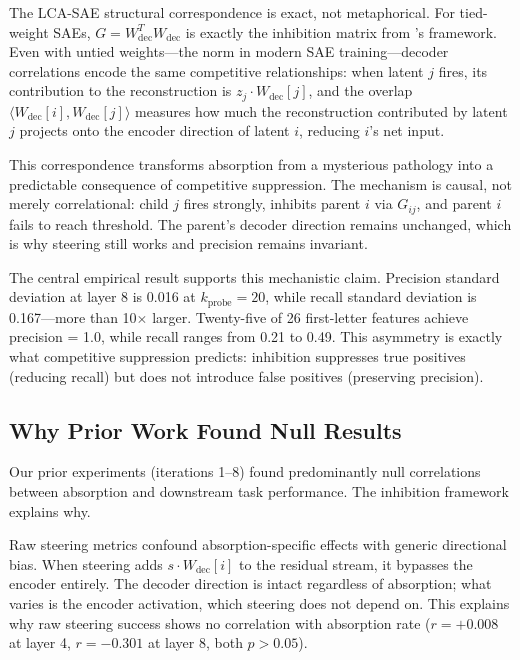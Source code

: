 \documentclass{article}
\begin{document}
The LCA-SAE structural correspondence is exact, not metaphorical. For tied-weight SAEs, $G = W_{\text{dec}}^T W_{\text{dec}}$ is exactly the inhibition matrix from \citet{rozell2008sparse}'s framework. Even with untied weights---the norm in modern SAE training---decoder correlations encode the same competitive relationships: when latent $j$ fires, its contribution to the reconstruction is $z_j \cdot W_{\text{dec}}[j]$, and the overlap $\langle W_{\text{dec}}[i], W_{\text{dec}}[j] \rangle$ measures how much the reconstruction contributed by latent $j$ projects onto the encoder direction of latent $i$, reducing $i$'s net input.

This correspondence transforms absorption from a mysterious pathology into a predictable consequence of competitive suppression. The mechanism is causal, not merely correlational: child $j$ fires strongly, inhibits parent $i$ via $G_{ij}$, and parent $i$ fails to reach threshold. The parent's decoder direction remains unchanged, which is why steering still works and precision remains invariant.

The central empirical result supports this mechanistic claim. Precision standard deviation at layer 8 is 0.016 at $k_{\text{probe}} = 20$, while recall standard deviation is 0.167---more than 10$\times$ larger. Twenty-five of 26 first-letter features achieve precision = 1.0, while recall ranges from 0.21 to 0.49. This asymmetry is exactly what competitive suppression predicts: inhibition suppresses true positives (reducing recall) but does not introduce false positives (preserving precision).

\subsection{Why Prior Work Found Null Results}

Our prior experiments (iterations 1--8) found predominantly null correlations between absorption and downstream task performance. The inhibition framework explains why.

Raw steering metrics confound absorption-specific effects with generic directional bias. When steering adds $s \cdot W_{\text{dec}}[i]$ to the residual stream, it bypasses the encoder entirely. The decoder direction is intact regardless of absorption; what varies is the encoder activation, which steering does not depend on. This explains why raw steering success shows no correlation with absorption rate ($r = +0.008$ at layer 4, $r = -0.301$ at layer 8, both $p > 0.05$).
\end{document}
